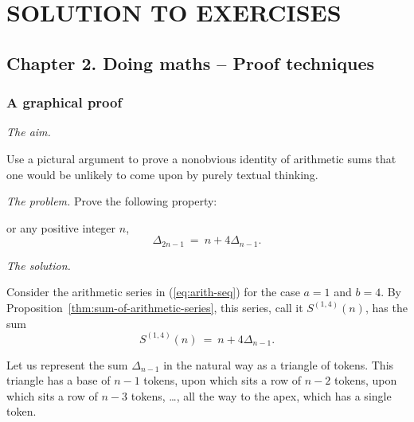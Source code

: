 
\chapter{SOLUTION TO EXERCISES}
\label{ch:Exercises}



\section{Chapter 2. Doing maths -- Proof techniques}

\subsection{A graphical proof}

\noindent \textit{The aim.}

Use a pictural argument to prove a nonobvious identity of arithmetic sums
that one would be unlikely to come upon by purely textual thinking.
\medskip

\noindent \textit{The problem.}
Prove the following property:

or any positive integer $n$,
\[ \Delta_{2n-1} \ = \ n + 4 \Delta_{n-1}. \]
\medskip

\noindent \textit{The solution.}

Consider the arithmetic series in (\ref{eq:arith-seq}) for the case
$a=1$ and $b=4$.  
By Proposition~\ref{thm:sum-of-arithmetic-series},
this series, call it $S^{(1,4)}(n)$, has the sum
\begin{equation}
\label{eq:triangles}
S^{(1,4)}(n) \ = \ n + 4 \Delta_{n-1}.
\end{equation}

Let us represent the sum $\Delta_{n-1}$ in the natural way as a
triangle of tokens.  This triangle has a base of $n-1$ tokens, upon
which sits a row of $n-2$ tokens, upon which sits a row of $n-3$
tokens, \ldots, all the way to the apex, which has a single token.

